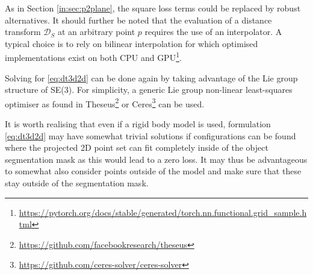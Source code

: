 As in Section \ref{in:sec:p2plane}, the square loss terms could be replaced by robust alternatives.
It should further be noted that the evaluation of a distance transform $\mathcal{D}_{S}$ at an arbitrary point $p$ requires the use of an interpolator.
A typical choice is to rely on bilinear interpolation for which optimised implementations exist on both CPU and GPU\footnote{\url{https://pytorch.org/docs/stable/generated/torch.nn.functional.grid_sample.html}}.

Solving for \eqref{eq:dt3d2d} can be done again by taking advantage of the Lie group structure of SE(3). For simplicity, a generic Lie group non-linear least-squares optimiser as found in Theseus\footnote{\url{https://github.com/facebookresearch/theseus}} \cite{Pineda:NeurIPS:2023} or Ceres\footnote{\url{https://github.com/ceres-solver/ceres-solver}} \cite{Agarwal:Ceres:2022} can be used.

It is worth realising that even if a rigid body model is used, formulation \eqref{eq:dt3d2d} may have somewhat trivial solutions if configurations can be found where the projected 2D point set can fit completely inside of the object segmentation mask as this would lead to a zero loss. It may thus be advantageous to somewhat also consider points outside of the model and make sure that these stay outside of the segmentation mask.

